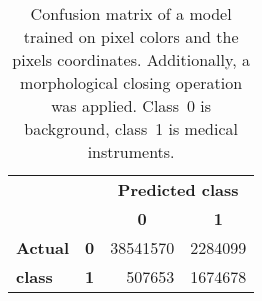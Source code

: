 \begin{appendices}
\begin{table}[ht]
    \centering
    \begin{tabular}{llrr}
    \toprule
    ~                & ~ & \multicolumn{2}{c}{\textbf{Predicted class}}\\
    ~                & ~ & \multicolumn{1}{c}{\textbf{0}} & \multicolumn{1}{c}{\textbf{1}} \\%
    \textbf{Actual}  & \multicolumn{1}{c}{\textbf{0}} & \num{38541570}  & \num{2284099} \\
    \textbf{class}   & \multicolumn{1}{c}{\textbf{1}} &   \num{507653}  & \num{1674678} \\ \bottomrule
    \end{tabular}
    \caption{Confusion matrix of a model trained on pixel colors and the pixels coordinates. Additionally, a morphological closing operation was applied.
             Class~0 is background, class~1 is medical instruments.}
    \label{table:cm-model-303}
\end{table}
\end{appendices}
